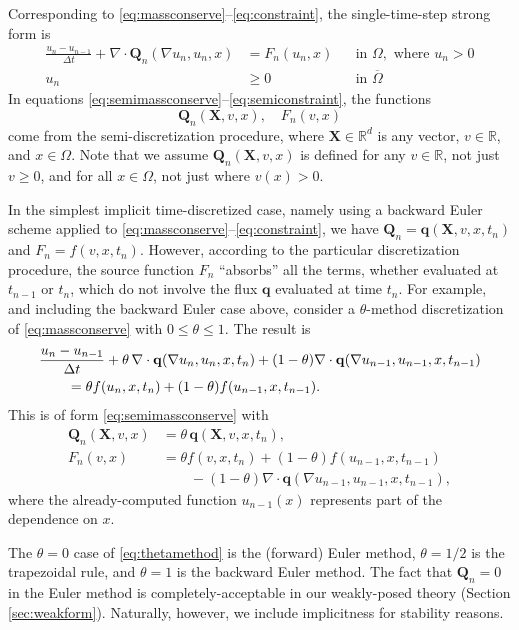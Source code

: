 \documentclass[final,leqno,onefignum,onetabnum]{siamltex1213bueler}
\newcommand\bq{\mathbf{q}}
\newcommand\bQ{\mathbf{Q}}
\newcommand\bX{\mathbf{X}}
\newcommand{\Div}{\nabla\cdot}
\renewcommand{\grad}{\nabla}
\newcommand\RR{\mathbb{R}}
\begin{document}
Corresponding to \eqref{eq:massconserve}--\eqref{eq:constraint}, the single-time-step strong form is
\begin{align}
\frac{u_n - u_{n-1}}{\Delta t} + \Div \bQ_n(\grad u_n,u_n,x) &= F_n(u_n,x) &&\text{in } \Omega, \text{ where } u_n > 0 \label{eq:semimassconserve} \\
u_n &\ge 0 &&\text{in } \overline{\Omega} \label{eq:semiconstraint}
\end{align}
In equations \eqref{eq:semimassconserve}--\eqref{eq:semiconstraint}, the functions
\begin{equation}
\bQ_n(\bX,v,x), \quad F_n(v,x) \label{eq:functionalforms}
\end{equation}
come from the semi-discretization procedure, where $\bX\in\RR^d$ is any vector, $v\in\RR$, and $x\in \Omega$.  Note that we assume $\bQ_n(\bX,v,x)$ is defined for any $v\in\RR$, not just $v\ge 0$, and for all $x\in\Omega$, not just where $v(x)>0$.

In the simplest implicit time-discretized case, namely using a backward Euler scheme applied to \eqref{eq:massconserve}--\eqref{eq:constraint}, we have $\bQ_n = \bq(\bX,v,x,t_n)$ and $F_n = f(v,x,t_n)$.  However, according to the particular discretization procedure, the source function $F_n$ ``absorbs'' all the terms, whether evaluated at $t_{n-1}$ or $t_n$, which do not involve the flux $\bq$ evaluated at time $t_n$.  For example, and including the backward Euler case above, consider a $\theta$-method discretization of \eqref{eq:massconserve} with $0\le \theta \le 1$.  The result is
\begin{align}
  &\frac{u_n - u_{n-1}}{\Delta t} + \theta\, \Div \bq(\grad u_n,u_n,x,t_n) + (1-\theta) \Div \bq(\grad u_{n-1},u_{n-1},x,t_{n-1}) \label{eq:thetamethod} \\
  &\qquad =  \theta f(u_n,x,t_n) + (1-\theta) f(u_{n-1},x,t_{n-1}). \notag
\end{align}
This is of form \eqref{eq:semimassconserve} with
\begin{align*}
\bQ_n(\bX,v,x) &= \theta\, \bq(\bX,v,x,t_n), \\
F_n(v,x)       &= \theta f(v,x,t_n) + (1-\theta) f(u_{n-1},x,t_{n-1}) \\
               &\qquad - (1-\theta) \Div \bq(\grad u_{n-1},u_{n-1},x,t_{n-1}),
\end{align*}
where the already-computed function $u_{n-1}(x)$ represents part of the dependence on $x$.

The $\theta=0$ case of \eqref{eq:thetamethod} is the (forward) Euler method, $\theta=1/2$ is the trapezoidal rule, and $\theta=1$ is the backward Euler method.  The fact that $\bQ_n=0$ in the Euler method is completely-acceptable in our weakly-posed theory (Section \ref{sec:weakform}).  Naturally, however, we include implicitness for stability reasons.
\end{document}
